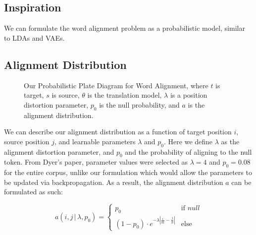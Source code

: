 \documentclass[twoside,twocolumn]{article}
\begin{document}
\subsection{Inspiration}
We can formulate the word alignment problem as a probabilistic model, similar to LDAs and VAEs.

\subsection{Alignment Distribution}

\begin{figure}
\centering
{}
\caption{Our Probabilistic Plate Diagram for Word Alignment, where $t$ is target, $s$ is source, $\theta$ is the translation model, $\lambda$ is a position distortion parameter, $p_0$ is the null probability, and $a$ is the alignment distribution.}
\end{figure}

We can describe our alignment distribution as a function of target position $i$, source position $j$, and learnable parameters $\lambda$ and $p_0$. Here we define $\lambda$ as the alignment distortion parameter, and $p_0$ and the probability of aligning to the null token. From Dyer's paper, parameter values were selected as $\lambda=4$ and $p_0=0.08$ for the entire corpus, unlike our formulation which would allow the parameters to be updated via backpropagation. As a result, the alignment distribution $a$ can be formulated as such:

\begin{equation}
a(i, j \, | \, \lambda, p_0) =
\begin{cases} 
      p_0 & \text{if } null \\
     (1-p_0) \cdot e^{-\lambda | \frac{i}{m} - \frac{j}{n}|} & \text{else}
   \end{cases}
\end{equation}
\end{document}

